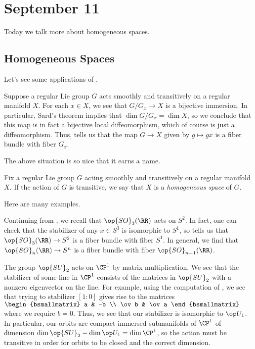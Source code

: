 \documentclass[../notes.tex]{subfiles}
\begin{document}
\section{September 11}
Today we talk more about homogeneous spaces.

\subsection{Homogeneous Spaces}
Let's see some applications of .
\begin{example} \label{ex:transitive-group-action}
	Suppose a regular Lie group $G$ acts smoothly and transitively on a regular manifold $X$. For each $x\in X$, we see that $G/G_x\to X$ is a bijective immersion. In particular, Sard's theorem implies that $\dim G/G_x=\dim X$, so we conclude that this map is in fact a bijective local diffeomorphism, which of course is just a diffeomorphism. Thus,  tells us that the map $G\to X$ given by $g\mapsto gx$ is a fiber bundle with fiber $G_x$.
\end{example}
The above situation is so nice that it earns a name.
\begin{definition}
	Fix a regular Lie group $G$ acting smoothly and transitively on a regular manifold $X$. If the action of $G$ is transitive, we say that $X$ is a \textit{homogeneous space} of $G$.
\end{definition}
Here are many examples.
\begin{example}
	Continuing from , we recall that $\op{SO}_3(\RR)$ acts on $S^2$. In fact, one can check that the stabilizer of any $x\in S^3$ is isomorphic to $S^1$, so  tells us that $\op{SO}_3(\RR)\to S^2$ is a fiber bundle with fiber $S^1$. In general, we find that $\op{SO}_n(\RR)\to S^n$ is a fiber bundle with fiber $\op{SO}_{n-1}(\RR)$.\todo{}
\end{example}
\begin{example}
	The group $\op{SU}_2$ acts on $\CP^1$ by matrix multiplication. We see that the stabilizer of some line in $\CP^1$ consists of the matrices in $\op{SU}_2$ with a nonzero eigenvector on the line. For example, using the computation of , we see that trying to stabilizer $[1:0]$ gives rise to the matrices $\begin{bsmallmatrix}
		a & -b \\
		\ov b & \ov a
	\end{bsmallmatrix}$ where we require $b=0$. Thus, we see that our stabilizer is isomorphic to $\op U_1$. In particular, our orbits are compact immersed submanifolds of $\CP^1$ of dimension $\dim{\op{SU}_2}-\dim{\op U_1}=\dim\CP^1$, so the action must be transitive in order for orbits to be closed and the correct dimension.
\end{example}
\end{document}
